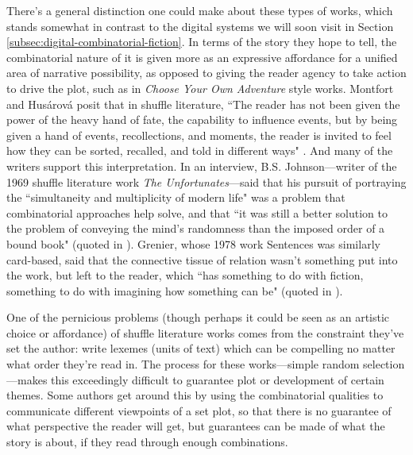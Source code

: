 There's a general distinction one could make about these types of works, which stands somewhat in contrast to the digital systems we will soon visit in Section \ref{subsec:digital-combinatorial-fiction}. In terms of the story they hope to tell, the combinatorial nature of it is given more as an expressive affordance for a unified area of narrative possibility, as opposed to giving the reader agency to take action to drive the plot, such as in \textit{Choose Your Own Adventure} style works. Montfort and Husárová posit that in shuffle literature, ``The reader has not been given the power of the heavy hand of fate, the capability to influence events, but by being given a hand of events, recollections, and moments, the reader is invited to feel how they can be sorted, recalled, and told in different ways" \cite{shuffle_2012}. And many of the writers support this interpretation. In an interview, B.S. Johnson---writer of the 1969 shuffle literature work \textit{The Unfortunates}---said that his pursuit of portraying the ``simultaneity and multiplicity of modern life" was a problem that combinatorial approaches help solve, and that ``it was still a better solution to the problem of conveying the mind’s randomness than the imposed order of a bound book" (quoted in \cite{coe_2002}). Grenier, whose 1978 work Sentences was similarly card-based, said that the connective tissue of relation wasn't something put into the work, but left to the reader, which ``has something to do with fiction, something to do with imagining how something can be" (quoted in \cite{shuffle_2012}).

One of the pernicious problems (though perhaps it could be seen as an artistic choice or affordance) of shuffle literature works comes from the constraint they've set the author: write lexemes (units of text) which can be compelling no matter what order they're read in. The process for these works---simple random selection---makes this exceedingly difficult to guarantee plot or development of certain themes. Some authors get around this by using the combinatorial qualities to communicate different viewpoints of a set plot, so that there is no guarantee of what perspective the reader will get, but guarantees can be made of what the story is about, if they read through enough combinations.

